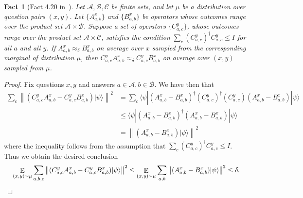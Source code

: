 \documentclass[11pt]{article}
\newtheorem{fact}[theorem]{Fact}
\theoremstyle{definition}
\newcommand{\ket}[1]{|#1\rangle}
\newcommand{\bra}[1]{\langle#1|}
\newcommand{\Id}{\ensuremath{I}}
\newcommand{\E}{\mathop{\mathbb{E}}\displaylimits}
\renewcommand{\cal}[1]{\mathcal{#1}}
\begin{document}
\begin{fact}[Fact 4.20 in~\cite{NW19}]
  \label{fact:add-a-proj}
  Let $\cal{A},\cal{B},\cal{C}$ be finite sets, and let $\mu$ be a distribution
  over question pairs $(x,y)$.
  Let $\{A_{a,b}^x\}$ and $\{B_{a,b}^x\}$ be operators whose outcomes range over the
  product set $\cal{A} \times \cal{B}$.
  Suppose a set of operators $\{C_{a,c}^y\}$, whose outcomes range over the
  product set $\cal{A} \times \cal{C}$, satisfies the condition $\sum_{c}
  (C_{a,c}^y)^\dagger C_{a,c}^y \leq \Id$ for all $a$ and all $y$.
  If $A_{a,b}^x \approx_\delta B_{a,b}^x$ on average over $x$ sampled from the
  corresponding marginal of distribution $\mu$, then $C^y_{a,c} A^x_{a,b}
  \approx_\delta C^y_{a,c} B^x_{a,b}$ on average over $(x,y)$ sampled from $\mu$.
\end{fact}
\begin{proof}
  Fix questions $x,y$ and answers $a \in \cal{A},b \in \cal{B}$. We have then that
  \begin{align}
    \sum_{c} \left \| (C^y_{a,c} A^x_{a,b} - C^y_{a,c} B^x_{a,b} ) \ket{\psi} \right \|^2
    & = \sum_{c} \bra{\psi} (A^x_{a,b} - B^x_{a,b})^\dagger (C^y_{a,c})^\dagger (C^y_{a,c})
      (A^x_{a,b} - B^x_{a,b} ) \ket{\psi}\\
    & \leq \bra{\psi} (A^x_{a,b} - B^x_{a,b})^\dagger
      (A^x_{a,b} - B^x_{a,b} ) \ket{\psi} \\
    & = \left \| (A^x_{a,b} - B^x_{a,b})\ket{\psi} \right \|^2
  \end{align}
  where the inequality follows from the assumption that $\sum_c (C_{a,c}^y)^\dagger
  C_{a,c}^y \leq \Id$.
  Thus we obtain the desired conclusion
  \begin{equation*}
    \E_{(x,y) \sim \mu} \sum_{a,b,c} \left \| (C^y_{a,c} A^x_{a,b} - C^y_{a,c} B^x_{a,b} )
      \ket{\psi} \right \|^2 	\leq \E_{(x,y) \sim \mu} \sum_{a,b}
    \left \| (A^x_{a,b} - B^x_{a,b})\ket{\psi} \right \|^2 \leq \delta.
  \end{equation*}
\end{proof}
\end{document}

